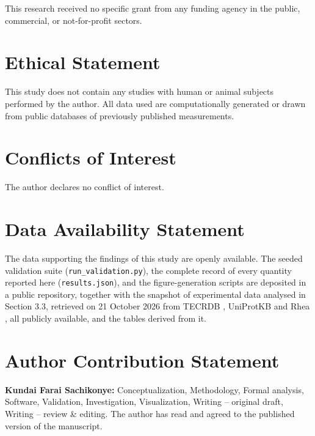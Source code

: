 \documentclass[11pt,a4paper]{article}
\theoremstyle{pstyle}
\theoremstyle{definition}
\theoremstyle{remark}
\begin{document}
This research received no specific grant from any funding agency in the
public, commercial, or not-for-profit sectors.

\section*{Ethical Statement}

This study does not contain any studies with human or animal subjects
performed by the author. All data used are computationally generated or
drawn from public databases of previously published measurements.

\section*{Conflicts of Interest}

The author declares no conflict of interest.

\section*{Data Availability Statement}

The data supporting the findings of this study are openly available.
The seeded validation suite (\texttt{run\_validation.py}), the complete
record of every quantity reported here (\texttt{results.json}), and the
figure-generation scripts are deposited in a public repository,
together with the snapshot of experimental data analysed in
Section 3.3, retrieved on 21 October 2026 from TECRDB
\citep{goldberg2004}, UniProtKB \citep{uniprot2025} and Rhea
\citep{bansal2022}, all publicly available, and the tables derived from
it.

\section*{Author Contribution Statement}

\textbf{Kundai Farai Sachikonye:} Conceptualization, Methodology,
Formal analysis, Software, Validation, Investigation, Visualization,
Writing -- original draft, Writing -- review \& editing. The author
has read and agreed to the published version of the manuscript.



\end{document}
